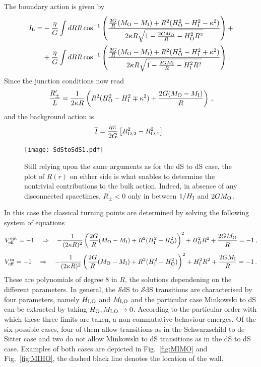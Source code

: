 \documentclass[11pt,a4paper]{article}
\begin{document}
The boundary action is given by
\begin{align}
I_{\rm b} = &- \frac{\eta}{G}\int dR R \cos^{-1} \left(\frac{\frac{2G}{R}(M_{\rm O} - M_{\rm I}) + R^2(H_{\rm O}^2 - H_{\rm I}^2 - \kappa^2)}{2 \kappa R \sqrt{1 - \frac{2GM_{\rm O}}{R} - H_{\rm O}^2 R^2}}\right) + \nonumber \\
&+ \frac{\eta}{G}\int dR R \cos^{-1} \left(\frac{\frac{2G}{R}(M_{\rm O} - M_{\rm I}) + R^2 (H_{\rm O}^2 - H_{\rm I}^2 + \kappa^2)}{2 \kappa R \sqrt{1 - \frac{2GM_{\rm I}}{R} - H_{\rm I}^2 R^2}}\right) \,.
\end{align}
Since the junction conditions now read
\begin{equation}
\frac{R^{\prime}_{\pm}}{L} = \frac{1}{2 \kappa R}\left(R^2 (H_{\rm O}^2 - H_{\rm I}^2 \mp \kappa^2) + \frac{2G(M_{\rm O} - M_{\rm I})}{R}\right) \,,
\end{equation}
and the background action is
\begin{equation} 
\overline{I} = \frac{\eta \pi}{2G} \left[R_{\rm{O},2}^{2} - R_{\rm{O},1}^{2}\right] \,.
\end{equation} 
\begin{figure}[h!]
\begin{center} 
\texttt{[image: SdStoSdS1.pdf]} 
\caption{\footnotesize{Still relying upon the same arguments as for the dS to dS case, the plot of $R(r)$ on either side is what enables to determine the nontrivial contributions to the bulk action. Indeed, in absence of any disconnected spacetimes, $R^{\prime}_{\pm} < 0$ only in between $1/H_{\rm I}$ and $2GM_{\rm O}$.}}
\end{center} 
\end{figure}

\noindent In this case the classical turning points are determined by solving the following system of equations
\begin{equation}
V_{\rm eff}^{\rm out} = -1 \quad \Rightarrow \quad - \frac{1}{(2 \kappa R)^2} \left(\frac{2G}{R}(M_{\rm O} - M_{\rm I}) + R^2 (H_{\rm I}^2 - H_{\rm O}^2) \right)^2 + H_{\rm O}^2 R^2 +\frac{2GM_{\rm O}}{R} = -1 \,, \nonumber
\end{equation}
\begin{equation}
V_{\rm eff}^{\rm in} = -1 \quad  \Rightarrow \quad -\frac{1}{(2 \kappa R)^2} \left(\frac{2G}{R}(M_{\rm O} - M_{\rm I}) + R^2 (H_{\rm I}^2 - H_{\rm O}^2)\right)^2 + H_{\rm I}^2 R^2 +\frac{2GM_{\rm I}}{R} = -1\,. \nonumber
\end{equation}
These are polynomials of degree 8 in $R$, the solutions dependening on the different parameters. In general, the  $\mathcal{S}$dS to $\mathcal{S}$dS transitions are characterised by four parameters, namely $H_{\rm I,O}$ and $M_{\rm I,O}$ and the particular case Minkowski to dS can be extracted by taking $H_{\rm O}, M_{\rm I,O} \rightarrow 0$. According to the particular order with which these three limits are taken, a non-commutative behaviour emerges. Of the six possible cases, four of them allow transitions as in the Schwarzschild to de Sitter case and two do not allow Minkowski to dS transitions as in the dS to dS case. Examples of both cases are depicted in Fig.~\ref{fig:MIMO} and Fig.~\ref{fig:MIHO}, the dashed black line denotes the location of the wall. 
\end{document}
